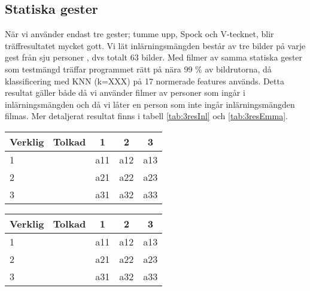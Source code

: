 \documentclass[../rapport_MVEX01-11-05]{subfiles}
\begin{document}
\subsection{Statiska gester}
När vi använder endast tre gester; tumme upp, Spock och V-tecknet,
blir träffresultatet mycket gott. Vi lät inlärningsmängden består av
tre bilder på varje gest från sju personer , dvs
totalt 63 bilder. Med filmer av samma statiska gester som
testmängd träffar programmet rätt på nära 99 \% av bildrutorna, då
klassificering med KNN (k=XXX) på 17 normerade
features används. Detta
resultat gäller både då vi använder filmer av personer som ingår i
inlärningsmängden och då vi låter en person som inte ingår
inlärningsmängden filmas. Mer detaljerat resultat finns i tabell
\ref{tab:3resInl} och \ref{tab:3resEmma}.

\begin{center}
\label{tab:3resInl}
  \begin{tabular}{| l || c | c | c | }
    \hline
    
   Verklig \ Tolkad & 1 & 2 & 3 \\ \hline \hline
   1&a11&a12&a13 \\ \hline
   2&a21&a22&a23 \\ \hline
   3&a31&a32&a33 \\ \hline
    \hline
  \end{tabular}
\end{center}

\begin{center}
\label{tab:3resEmma}
  \begin{tabular}{| l || c | c | c | }
    \hline
    
   Verklig \ Tolkad & 1 & 2 & 3 \\ \hline \hline
   1&a11&a12&a13 \\ \hline
   2&a21&a22&a23 \\ \hline
   3&a31&a32&a33 \\ \hline
    \hline
  \end{tabular}
\end{center}
\end{document}
